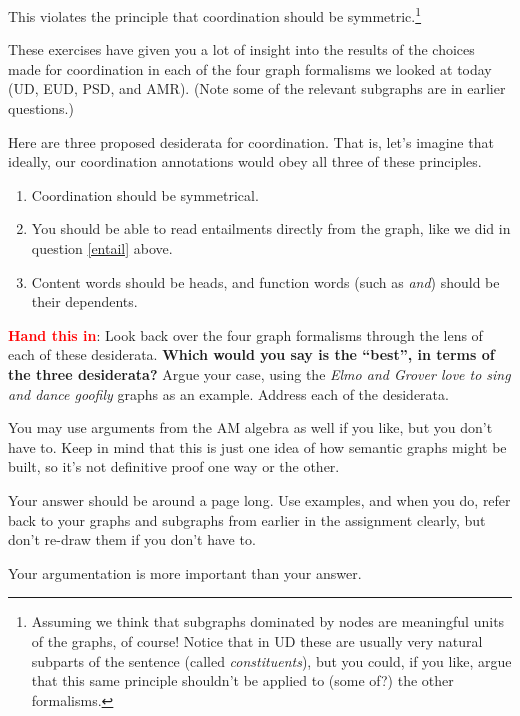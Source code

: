 \documentclass[addpoints
]{exam}
\theoremstyle{definition}
\newcommand{\handin}{\textcolor{red}{\textbf{Hand this in}}}
\begin{document}
\begin{questions}
    
    This violates the principle that coordination should be symmetric.\footnote{Assuming we think that subgraphs dominated by nodes are meaningful units of the graphs, of course! Notice that in UD these are usually very natural subparts of the sentence (called \textit{constituents}), but you could, if you like, argue that this same principle shouldn't be applied to (some of?) the other formalisms.}

    These exercises have given you a lot of insight into the results of the choices made for coordination in each of the four graph formalisms we looked at today (UD, EUD, PSD, and AMR). (Note some of the relevant subgraphs are in earlier questions.)

    Here are three proposed desiderata for coordination. That is, let's imagine that ideally, our coordination annotations would obey all three of these principles.

    \begin{enumerate}
    \item Coordination should be symmetrical.
    \item You should be able to read entailments directly from the graph, like we did in question \ref{entail} above.
    \item Content words should be heads, and function words (such as \textit{and}) should be their dependents.
    \end{enumerate}

 \handin:   Look back over the four graph formalisms through the lens of each of these desiderata. \textbf{Which would you say is the ``best'', in terms of the three desiderata?} Argue your case, using the  \textit{Elmo and Grover love to sing and dance goofily} graphs as an example. Address each of the desiderata.

 You may use arguments from the AM algebra as well if you like, but you don't have to. Keep in mind that this is just one idea of how semantic graphs might be built, so it's not definitive proof one way or the other.
 
    Your answer should be around a page long. Use examples, and when you do, refer back to your graphs and subgraphs from earlier in the assignment clearly, but don't re-draw them if you don't have to. 

    Your argumentation is more important than your answer.
    
    \begin{solution}
      
      
    \end{solution}



\end{questions}

\FloatBarrier
\appendix

\end{document}
